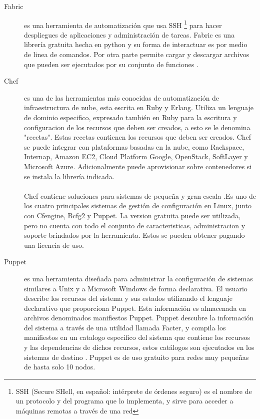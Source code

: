 \begin{description}
\item [Fabric]
 es una herramienta de automatización que usa SSH \footnote{SSH (Secure SHell, en español: intérprete de órdenes seguro) es el nombre de un protocolo y del programa que lo implementa, y sirve para acceder a máquinas remotas a través de una red} para hacer despliegues de aplicaciones y administración de tareas. Fabric es una librería gratuita hecha en python y su forma de interactuar es por medio de linea de comandos. Por otra parte permite cargar y descargar archivos que pueden ser ejecutados por su conjunto de funciones \cite{fabfile16}.

\item [Chef]
es una de las herramientas más conocidas de automatización de infraestructura de nube, esta escrita en Ruby y Erlang. Utiliza un lenguaje de dominio especifico, expresado también en Ruby para la escritura y configuracion de los recursos que deben ser creados, a esto se le denomina "recetas". Estas recetas contienen los recursos que deben ser creados. Chef se puede integrar con plataformas basadas en la nube, como Rackspace, Internap, Amazon EC2, Cloud Platform Google, OpenStack, SoftLayer y Microsoft Azure. Adicionalmente puede aprovisionar sobre contenedores si se instala la librería indicada. \\
\\
Chef contiene soluciones para sistemas de pequeña y gran escala \cite{Chef15}.Es uno de los cuatro principales sistemas de gestión de configuración en Linux, junto con Cfengine, Bcfg2 y Puppet. La version gratuita puede ser utilizada, pero no cuenta con todo el conjunto de caracteristicas, administracion y soporte brindados por la herramienta. Estos se pueden obtener pagando una licencia de uso.


\item [Puppet]
es una herramienta diseñada para administrar la configuración de sistemas similares a Unix y a Microsoft Windows de forma declarativa. El usuario describe los recursos del sistema y sus estados utilizando el lenguaje declarativo que proporciona Puppet. Esta información es almacenada en archivos denominados manifiestos Puppet. Puppet descubre la información del sistema a través de una utilidad llamada Facter, y compila los manifiestos en un catalogo especifico del sistema que contiene los recursos y las dependencias de dichos recursos, estos catálogos son ejecutados en los sistemas de destino \cite{Pupet15}. Puppet es de uso gratuito para redes muy pequeñas de hasta solo 10 nodos.


\end{description}
